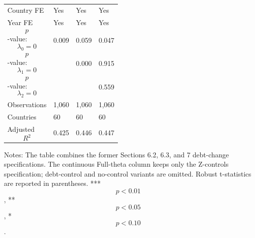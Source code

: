 \begin{table}[H]
\begin{threeparttable}
\begin{tabularx}{\textwidth}{lYYY}
Country FE & Yes & Yes & Yes \\
Year FE & Yes & Yes & Yes \\
$$p$$-value: $$\lambda_0=0$$ & 0.009 & 0.059 & 0.047 \\
$$p$$-value: $$\lambda_1=0$$ &  & 0.000 & 0.915 \\
$$p$$-value: $$\lambda_2=0$$ &  &  & 0.559 \\
Observations & 1,060 & 1,060 & 1,060 \\
Countries & 60 & 60 & 60 \\
Adjusted $$R^2$$ & 0.425 & 0.446 & 0.447 \\
\bottomrule
\end{tabularx}
\begin{tablenotes}[flushleft]\footnotesize
\item Notes: The table combines the former Sections 6.2, 6.3, and 7 debt-change specifications. The continuous Full-theta column keeps only the Z-controls specification; debt-control and no-control variants are omitted. Robust t-statistics are reported in parentheses. *** $$p<0.01$$, ** $$p<0.05$$, * $$p<0.10$$.
\end{tablenotes}
\end{threeparttable}
\end{table}
